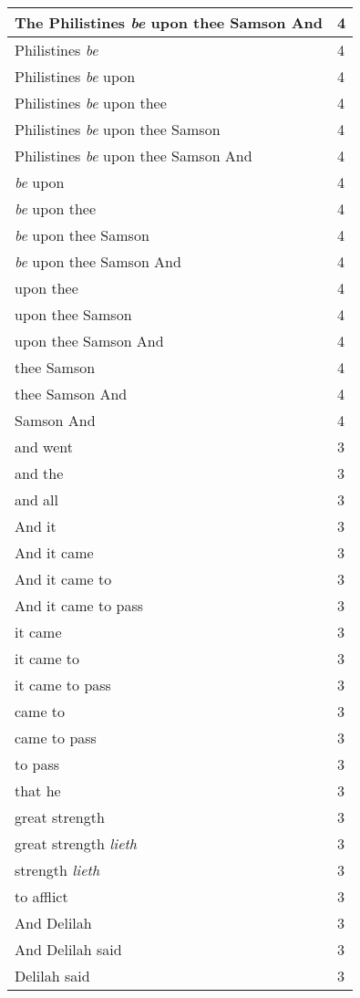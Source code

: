 \begin{center}
\begin{longtable}{|p{3.0in}|p{0.5in}|}
The Philistines \emph{be} upon thee Samson And & 4\\ \hline 
Philistines \emph{be} & 4\\ \hline 
Philistines \emph{be} upon & 4\\ \hline 
Philistines \emph{be} upon thee & 4\\ \hline 
Philistines \emph{be} upon thee Samson & 4\\ \hline 
Philistines \emph{be} upon thee Samson And & 4\\ \hline 
\emph{be} upon & 4\\ \hline 
\emph{be} upon thee & 4\\ \hline 
\emph{be} upon thee Samson & 4\\ \hline 
\emph{be} upon thee Samson And & 4\\ \hline 
upon thee & 4\\ \hline 
upon thee Samson & 4\\ \hline 
upon thee Samson And & 4\\ \hline 
thee Samson & 4\\ \hline 
thee Samson And & 4\\ \hline 
Samson And & 4\\ \hline 
and went & 3\\ \hline 
and the & 3\\ \hline 
and all & 3\\ \hline 
And it & 3\\ \hline 
And it came & 3\\ \hline 
And it came to & 3\\ \hline 
And it came to pass & 3\\ \hline 
it came & 3\\ \hline 
it came to & 3\\ \hline 
it came to pass & 3\\ \hline 
came to & 3\\ \hline 
came to pass & 3\\ \hline 
to pass & 3\\ \hline 
that he & 3\\ \hline 
great strength & 3\\ \hline 
great strength \emph{lieth} & 3\\ \hline 
strength \emph{lieth} & 3\\ \hline 
to afflict & 3\\ \hline 
And Delilah & 3\\ \hline 
And Delilah said & 3\\ \hline 
Delilah said & 3\\ \hline 

\end{longtable}
\end{center}
